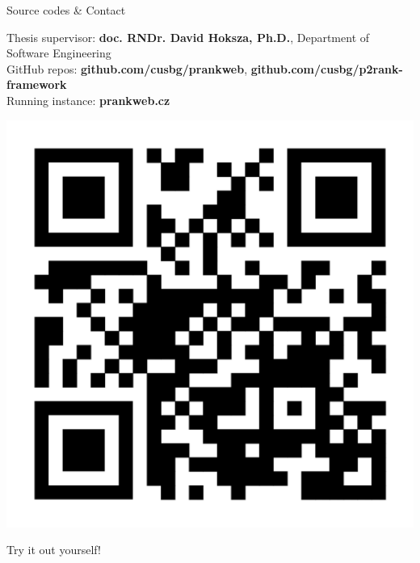 \documentclass[portrait,a0paper,fontscale=0.25]{baposter}
\begin{document}
\begin{poster}
\begin{posterbox}[column=1, name=conclusion, below=result2, bottomaligned=tech]{Source codes \& Contact}

\begin{minipage}[t]{\linewidth}
	\begin{minipage}[t]{0.75\linewidth}
		Thesis supervisor: \textbf{doc. RNDr. David Hoksza, Ph.D.}, Department of Software Engineering\\

		GitHub repos: \textbf{github.com/cusbg/prankweb}, \textbf{github.com/cusbg/p2rank-framework}\\

		Running instance: \textbf{prankweb.cz}
	\end{minipage}
	\quad
	\begin{minipage}[t]{0.20\linewidth}
		\vspace{-2ex}
		\includegraphics[width=1\linewidth]{./img/qr_prankweb_cz.png} %
		\begin{center}
			Try it out yourself!
		\end{center}
	\end{minipage}
\end{minipage}


\end{posterbox}

\end{poster}
\end{document}
